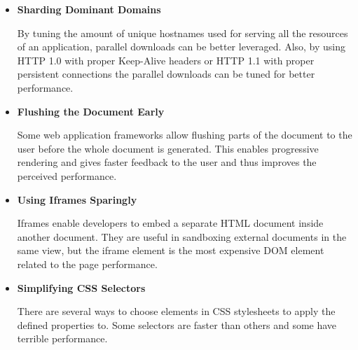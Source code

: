 \begin{itemize}
\item \textbf{Sharding Dominant Domains}

  By tuning the amount of unique hostnames used for serving all the
  resources of an application, parallel downloads can be better
  leveraged. Also, by using HTTP 1.0 with proper Keep-Alive headers or
  HTTP 1.1 with proper persistent connections the parallel downloads
  can be tuned for better performance.

\item \textbf{Flushing the Document Early}

  Some web application frameworks allow flushing parts of the document
  to the user before the whole document is generated. This enables
  progressive rendering and gives faster feedback to the user and thus
  improves the perceived performance.

\item \textbf{Using Iframes Sparingly}

  Iframes enable developers to embed a separate HTML document inside
  another document. They are useful in sandboxing external documents
  in the same view, but the iframe element is the most expensive DOM
  element related to the page performance.

\item \textbf{Simplifying CSS Selectors}

  There are several ways to choose elements in CSS stylesheets to
  apply the defined properties to. Some selectors are faster than
  others and some have terrible performance.

\end{itemize}
